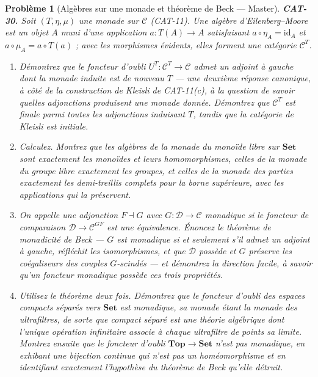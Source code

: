 \documentclass[11pt]{article}
\newtheorem{problem}{Problème}
\begin{document}
\begin{problem}[{Algèbres sur une monade et théorème de Beck --- Master}]
\textbf{CAT-30.} Soit $ (T, \eta, \mu) $ une monade sur $ \mathcal{C} $ (CAT-11). Une
\textit{algèbre d'Eilenberg--Moore} est un objet $ A $ muni d'une application $ a \colon T(A) \to A $
satisfaisant $ a \circ \eta_A = \mathrm{id}_A $ et $ a \circ \mu_A = a \circ T(a) $ ;
avec les morphismes évidents, elles forment une catégorie $ \mathcal{C}^{T} $.
\begin{enumerate}
\item[(a)] Démontrez que le foncteur d'oubli $ U^{T} \colon \mathcal{C}^{T} \to \mathcal{C} $ admet
un adjoint à gauche dont la monade induite est de nouveau $ T $ --- une deuxième réponse
canonique, à côté de la construction de Kleisli de CAT-11(c), à la question de savoir quelles
adjonctions produisent une monade donnée. Démontrez que $ \mathcal{C}^{T} $ est \textit{finale}
parmi toutes les adjonctions induisant $ T $, tandis que la catégorie de Kleisli est initiale.
\item[(b)] Calculez. Montrez que les algèbres de la monade du monoïde libre sur $ \mathbf{Set} $ sont
exactement les monoïdes et leurs homomorphismes, celles de la monade du groupe libre exactement
les groupes, et celles de la monade des parties exactement les demi-treillis complets pour la
borne supérieure, avec les applications qui la préservent.
\item[(c)] On appelle une adjonction $ F \dashv G $ avec $ G \colon \mathcal{D} \to \mathcal{C} $
\textit{monadique} si le foncteur de comparaison $ \mathcal{D} \to \mathcal{C}^{GF} $ est une
équivalence. Énoncez le théorème de monadicité de Beck --- $ G $ est monadique si et seulement
s'il admet un adjoint à gauche, réfléchit les isomorphismes, et que $ \mathcal{D} $ possède et
$ G $ préserve les coégaliseurs des couples $ G $-scindés --- et démontrez la direction facile,
à savoir qu'un foncteur monadique possède ces trois propriétés.
\item[(d)] Utilisez le théorème deux fois. Démontrez que le foncteur d'oubli des espaces compacts séparés
vers $ \mathbf{Set} $ est monadique, sa monade étant la monade des ultrafiltres, de sorte que
\og{} compact séparé \fg{} est une théorie algébrique dont l'unique opération infinitaire associe à chaque
ultrafiltre de points sa limite. Montrez ensuite que le foncteur d'oubli
$ \mathbf{Top} \to \mathbf{Set} $ n'est \textit{pas} monadique, en exhibant une bijection continue
qui n'est pas un homéomorphisme et en identifiant exactement l'hypothèse du théorème de Beck
qu'elle détruit.
\end{enumerate}

\end{problem}
\end{document}
